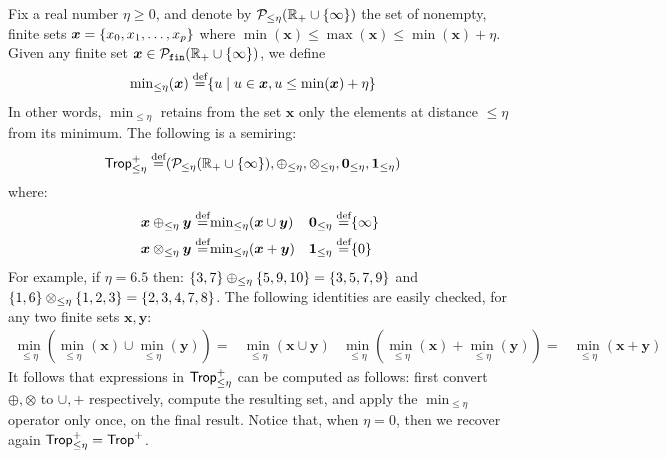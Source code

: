 \begin{ex} \label{ex:trop:eta} Fix a real number $\eta \geq 0$, and
  denote by $\mathcal P_{\leq \eta}(\mathbb R_+\cup\{\infty\})$ the set of
  nonempty, finite sets $\bm x = \{x_0, x_1, \ldots, x_p\}$ where
  $\min(\bm x) \leq \max(\bm x)\leq \min(\bm x) + \eta$.  Given any
  finite set $\bm x \in \mathcal P_{\texttt{fin}}(\mathbb R_+\cup\{\infty\})$,
  we define
  \begin{align*}
    {\min}_{\leq \eta}(\bm x) \stackrel{\text{def}}{=} & \{{u}\mid{u \in \bm x, u \leq \min(\bm x) + \eta}\}
  \end{align*}
  In other words, $\min_{\leq \eta}$ retains from the set $\bm x$ only
  the elements at distance $\leq \eta$ from its minimum.  The
  following is a semiring:
  \begin{align*}
    \text{\sf Trop}^+_{\leq\eta} \stackrel{\text{def}}{=} & (\mathcal P_{\leq \eta}(\mathbb R_+\cup\{\infty\}),\oplus_{\leq\eta},\otimes_{\leq\eta},\bm 0_{\leq\eta},\bm 1_{\leq\eta})
  \end{align*}
  where:
  \begin{align*}
    \bm x \oplus_{\leq\eta} \bm y \stackrel{\text{def}}{=} & {\min}_{\leq\eta}(\bm x \cup \bm y) &
    \bm 0_{\leq\eta} \stackrel{\text{def}}{=} & \{\infty\} \\
    \bm x \otimes_{\leq\eta} \bm y \stackrel{\text{def}}{=} & {\min}_{\leq\eta}(\bm x + \bm y)&
    \bm 1_{\leq\eta} \stackrel{\text{def}}{=} & \{0\}
   \end{align*}
   For example, if $\eta = 6.5$ then:
   $\{3,7\} \oplus_{\leq \eta} \{5,9,10\} = \{3,5,7,9\}$ and
   $\{1,6\} \otimes_{\leq \eta} \{1,2,3\} = \{2,3,4,7,8\}$.
   The following identities are easily checked, for any two finite
   sets $\bm x, \bm y$:
  \begin{align}
    {\min}_{\leq \eta}({\min}_{\leq \eta}(\bm x) \cup {\min}_{\leq \eta}(\bm y))= & {\min}_{\leq \eta}(\bm x \cup \bm y)&
    {\min}_{\leq \eta}({\min}_{\leq \eta}(\bm x) + {\min}_{\leq \eta}(\bm y))= & {\min}_{\leq \eta}(\bm x + \bm y) \label{eq:mineta:identity}
  \end{align}
  It follows that expressions in $\text{\sf Trop}^+_{\leq\eta}$ can be computed
  as follows: first convert $\oplus, \otimes$ to $\cup, +$
  respectively, compute the resulting set, and apply the
  $\min_{\leq\eta}$ operator only once, on the final result.
%
%
  Notice that, when $\eta=0$, then we recover again
  $\text{\sf Trop}^+_{\leq \eta} = \text{\sf Trop}^+$.
\end{ex}

